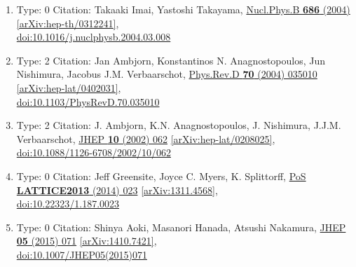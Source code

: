 \documentclass[a4paper,10pt]{article}
\begin{document}
\begin{enumerate}
\begin{enumerate}
  \item Type: 0 Citation: Takaaki Imai, Yastoshi Takayama, \href{https://www.doi.org/10.1016/j.nuclphysb.2004.03.008}{Nucl.Phys.B {\bf 686} (2004) }  \href{https://arxiv.org/abs/hep-th/0312241}{[arXiv:hep-th/0312241]},\\\href{https://www.doi.org/10.1016/j.nuclphysb.2004.03.008}{doi:10.1016/j.nuclphysb.2004.03.008}
  \item Type: 2 Citation: Jan Ambjorn, Konstantinos N. Anagnostopoulos, Jun Nishimura, Jacobus J.M. Verbaarschot, \href{https://www.doi.org/10.1103/PhysRevD.70.035010}{Phys.Rev.D {\bf 70} (2004) 035010}  \href{https://arxiv.org/abs/hep-lat/0402031}{[arXiv:hep-lat/0402031]},\\\href{https://www.doi.org/10.1103/PhysRevD.70.035010}{doi:10.1103/PhysRevD.70.035010}
  \item Type: 2 Citation: J. Ambjorn, K.N. Anagnostopoulos, J. Nishimura, J.J.M. Verbaarschot, \href{https://www.doi.org/10.1088/1126-6708/2002/10/062}{JHEP {\bf 10} (2002) 062}  \href{https://arxiv.org/abs/hep-lat/0208025}{[arXiv:hep-lat/0208025]},\\\href{https://www.doi.org/10.1088/1126-6708/2002/10/062}{doi:10.1088/1126-6708/2002/10/062}
  \item Type: 0 Citation: Jeff Greensite, Joyce C. Myers, K. Splittorff, \href{https://www.doi.org/10.22323/1.187.0023}{PoS {\bf LATTICE2013} (2014) 023}  \href{https://arxiv.org/abs/1311.4568}{[arXiv:1311.4568]},\\\href{https://www.doi.org/10.22323/1.187.0023}{doi:10.22323/1.187.0023}
  \item Type: 0 Citation: Shinya Aoki, Masanori Hanada, Atsushi Nakamura, \href{https://www.doi.org/10.1007/JHEP05(2015)071}{JHEP {\bf 05} (2015) 071}  \href{https://arxiv.org/abs/1410.7421}{[arXiv:1410.7421]},\\\href{https://www.doi.org/10.1007/JHEP05(2015)071}{doi:10.1007/JHEP05(2015)071}

\end{enumerate}
\end{enumerate}
\end{document}
